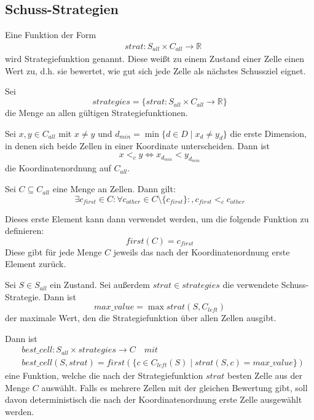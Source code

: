 \documentclass[a4paper,12pt]{llncs}
\numberwithin{equation}{section}
\begin{document}
\subsection{Schuss-Strategien}

\begin{definition}
Eine Funktion der Form
\begin{align}
&strat:S_{all} \times C_{all} \rightarrow \mathbb{R} \nonumber
\end{align}
wird Strategiefunktion genannt. Diese weißt zu einem Zustand einer Zelle einen Wert zu, d.h. sie bewertet, wie gut sich jede Zelle als nächstes Schussziel eignet.
\end{definition}

\begin{definition}
Sei
\[
strategies=\{ strat:S_{all} \times C_{all} \rightarrow \mathbb{R} \}
\]
die Menge an allen gültigen Strategiefunktionen.
\end{definition}

\begin{definition}
Sei $x,y \in C_{all}$ mit $x \neq y$ und $d_{min}=\min \{d \in D \mid x_d \neq y_d\}$ die erste Dimension, in denen sich beide Zellen in einer Koordinate unterscheiden.
Dann ist
\[
x <_c y \Leftrightarrow x_{d_{min}} < y_{d_{min}}
\]
die Koordinatenordnung auf $C_{all}$.
\end{definition}

\begin{definition}
Sei $C \subseteq C_{all}$ eine Menge an Zellen.
Dann gilt:
\[
\exists c_{first} \in C \colon \forall c_{other} \in C \setminus \{c_{first}\} \colon , c_{first} <_c c_{other}
\]

Dieses erste Element kann dann verwendet werden, um die folgende Funktion zu definieren:
\[
first(C)=c_{first}
\]
Diese gibt für jede Menge $C$ jeweils das nach der Koordinatenordnung erste Element zurück.
\end{definition}

\begin{definition}
Sei $S\in S_{all}$ ein Zustand.
Sei außerdem $strat \in strategies$ die verwendete Schuss-Strategie.
Dann ist
\[
max\_value=\max strat(S, C_{left})
\]
der maximale Wert, den die Strategiefunktion über allen Zellen ausgibt.

Dann ist
\begin{align}
&best\_cell:S_{all} \times strategies \rightarrow C \quad mit \nonumber\\
&best\_cell(S, strat)=first(\{c \in C_{left}(S) \mid strat(S, c) = max\_value\})
\nonumber
\end{align}
eine Funktion, welche die nach der Strategiefunktion $strat$ besten Zelle aus der Menge $C$ auswählt.
Falls es mehrere Zellen mit der gleichen Bewertung gibt, soll davon deterministisch die nach der Koordinatenordnung erste Zelle ausgewählt werden.
\end{definition}
\end{document}
